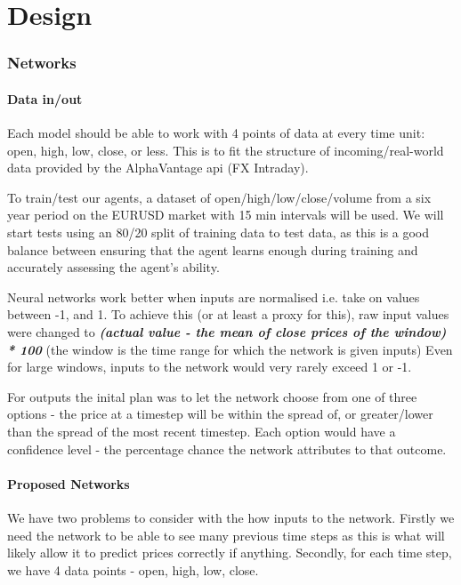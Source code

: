 \newpage
\part{Design}

    \graphicspath{{images/design/}}


    \section{Networks}
        
        \subsection{Data in/out}

        Each model should be able to work with 4 points of data at every time unit: open, high, low, close, or less. This is to fit the structure of incoming/real-world data provided by the AlphaVantage api (FX Intraday). 

        To train/test our agents, a dataset of open/high/low/close/volume from a six year period on the EURUSD market with 15 min intervals will be used. We will start tests using an 80/20 split of training data to test data, as this is a good balance between ensuring that the agent learns enough during training and accurately assessing the agent's ability. 

        Neural networks work better when inputs are normalised i.e. take on values between -1, and 1. To achieve this (or at least a proxy for this), raw input values were changed to \textbf{\textit{(actual value - the mean of close prices of the window) * 100}} (the window is the time range for which the network is given inputs) Even for large windows, inputs to the network would very rarely exceed 1 or -1.

        For outputs the inital plan was to let the network choose from one of three options - the price at a timestep will be within the spread of, or greater/lower than the spread of the most recent timestep. Each option would have a confidence level - the percentage chance the network attributes to that outcome.

        \subsection{Proposed Networks}

        We have two problems to consider with the how inputs to the network. Firstly we need the network to be able to see many previous time steps as this is what will likely allow it to predict prices correctly if anything. Secondly, for each time step, we have 4 data points - open, high, low, close.

